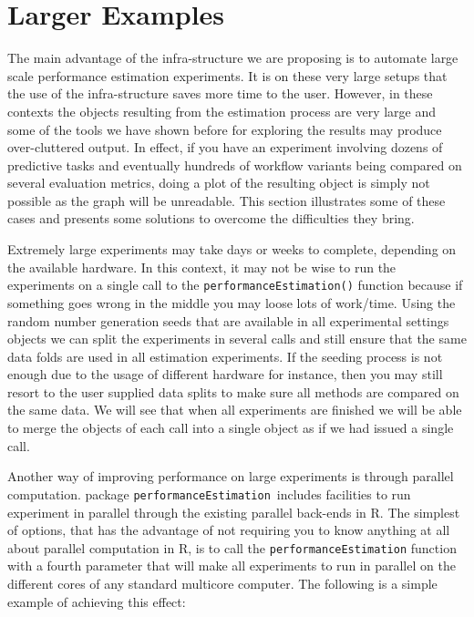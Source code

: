 \documentclass[10pt,a4paper]{article}\usepackage[]{graphicx}\usepackage[]{color}
\newcommand{\PE}{package \texttt{performanceEstimation}\ }
\begin{document}
\section{Larger Examples}

The main advantage of the infra-structure we are proposing is to
automate large scale performance estimation experiments. It is on these very
large setups that the use of the infra-structure saves more time to
the user. However, in these contexts the objects resulting from the
estimation process are very large and some of the tools we have shown before
for exploring the results may produce over-cluttered output. In
effect, if you have an experiment involving dozens of predictive tasks
and eventually hundreds of workflow variants being compared on several
evaluation metrics, doing a plot of the resulting object is simply not
possible as the graph will be unreadable. This section illustrates
some of these cases and presents some solutions to overcome the
difficulties they bring.

Extremely large experiments may take days or weeks to complete,
depending on the available hardware. In this context, it may not be
wise to run the experiments on a single call to the
\texttt{performanceEstimation()} function because if something goes
wrong in the middle you may loose lots of work/time. Using the random
number generation seeds that are available in all experimental
settings objects we can split the experiments in several calls and
still ensure that the same data folds are used in all
estimation experiments. If the seeding process is not enough due to the usage of different hardware for instance, then you may still resort to the user supplied data splits to make sure all methods are compared on the same data. We will see that when all experiments are
finished we will be able to merge the objects of each call into a
single object as if we had issued a single call. 

Another way of improving performance on large experiments is through parallel computation. \PE includes facilities to run experiment in parallel through the existing parallel back-ends in R. The simplest of options, that has the advantage of not requiring you to know anything at all about parallel computation in R, is to call the \texttt{performanceEstimation} function with a fourth parameter that will make all experiments to run in parallel on the different cores of any standard multicore computer. The following is a simple example of achieving this effect:
\end{document}
